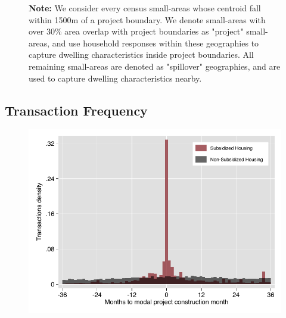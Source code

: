 \documentclass[12pt]{article}
\begin{document}
\begin{figure}[h!]
\centering
{}
\vspace{2mm}
\caption*{\footnotesize {\bf Note:} We consider every census small-areas whose centroid fall within 1500m of a project boundary. We denote small-areas with over 30\% area overlap with project boundaries as "project" small-areas, and use household responses within these geographies to capture dwelling characteristics inside project boundaries. All remaining small-areas are denoted as "spillover" geographies, and are used to capture dwelling characteristics nearby.}
\end{figure}

\pagebreak
\subsection{Transaction Frequency}
\label{appendix:histfreq}
\vspace{-5mm}
\begin{figure}[h!]
\centering
\includegraphics[scale=1.2,trim={.2cm 0.2cm .2cm 0.2cm},clip]{figures/transactions_histogram.pdf}
\end{figure}
\end{document}
